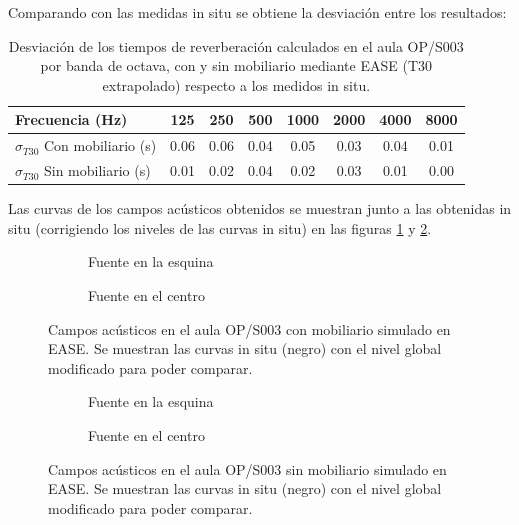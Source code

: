 Comparando con las medidas in situ se obtiene la desviación entre los resultados:

\begin{table}[ht]
\centering
{
\begin{tabular}{@{}lccccccc@{}}
\toprule
Frecuencia (Hz) & 125 & 250 & 500 & 1000 & 2000 & 4000 & 8000 \\ \midrule
$\sigma_{T30}$ Con mobiliario (s) & 0.06 & 0.06 & 0.04 & 0.05 & 0.03 & 0.04 & 0.01 \\
$\sigma_{T30}$ Sin mobiliario (s) & 0.01 & 0.02 & 0.04 & 0.02 & 0.03 & 0.01 & 0.00 \\ \bottomrule
\end{tabular}
}
\caption{Desviación de los tiempos de reverberación calculados en el aula OP/S003 por banda de octava, con y sin mobiliario mediante EASE (T30 extrapolado) respecto a los medidos in situ.}
\label{tab:desrevopease}
\end{table}
\FloatBarrier

Las curvas de los campos acústicos obtenidos se muestran junto a las obtenidas in situ (corrigiendo los niveles de las curvas in situ) en las figuras \ref{graf:easeopmob} y \ref{graf:easeopnomob}.

\begin{figure}[ht]
    \begin{subfigure}[b]{0.4\textwidth}
    	\centering%
         {%
    }
    \caption{Fuente en la esquina}%
    \end{subfigure}%
    \hspace{1.9cm}%
    \begin{subfigure}[b]{0.4\textwidth}%
    	\centering%
        {%
    }
    \caption{Fuente en el centro}%
    \end{subfigure}
    \caption{Campos acústicos en el aula OP/S003 con mobiliario simulado en EASE. Se muestran las curvas in situ (negro) con el nivel global modificado para poder comparar.}
    \label{graf:easeopmob}%
\end{figure}
\FloatBarrier 


\begin{figure}[ht]
    \begin{subfigure}[b]{0.4\textwidth}
    	\centering%
         {%
    }
    \caption{Fuente en la esquina}%
    \end{subfigure}%
    \hspace{1.9cm}%
    \begin{subfigure}[b]{0.4\textwidth}%
    	\centering%
        {%
    }
    \caption{Fuente en el centro}%
    \end{subfigure}
    \caption{Campos acústicos en el aula OP/S003 sin mobiliario simulado en EASE. Se muestran las curvas in situ (negro) con el nivel global modificado para poder comparar.}
    \label{graf:easeopnomob}%
\end{figure}
\FloatBarrier 

